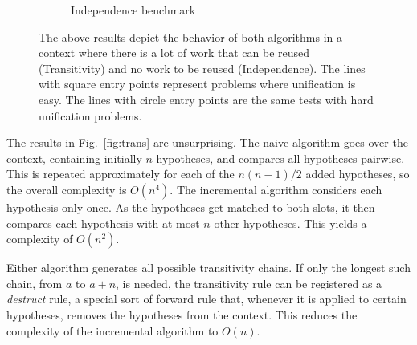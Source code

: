 \documentclass[runningheads]{llncs}
\begin{document}
\begin{figure}
\begin{subfigure}{.5\textwidth}
    \caption{Independence benchmark}
    \label{fig:indep}
  \end{subfigure}
  \caption{The above results depict the behavior of both algorithms in a context where there is a lot of work that can be reused (Transitivity) and no work to be reused (Independence). The lines with square entry points represent problems where unification is easy. The lines with circle entry points are the same tests with hard unification problems.}
  \label{fig:benchmark}
  \end{figure}

The results in Fig.~\ref{fig:trans} are unsurprising.
The naive algorithm goes over the context, containing initially $n$ hypotheses, and compares all hypotheses pairwise.
This is repeated approximately for each of the $n(n-1)/2$ added hypotheses, so the overall complexity is $O(n^4)$.
The incremental algorithm considers each hypothesis only once.
As the hypotheses get matched to both slots, it then compares each hypothesis with at most $n$ other hypotheses.
This yields a complexity of $O(n^2)$.

Either algorithm generates all possible transitivity chains.
If only the longest such chain, from $a$ to $a + n$, is needed, the transitivity rule can be registered as a \emph{destruct} rule, a special sort of forward rule that, whenever it is applied to certain hypotheses, removes the hypotheses from the context.
This reduces the complexity of the incremental algorithm to $O(n)$.
\end{document}
